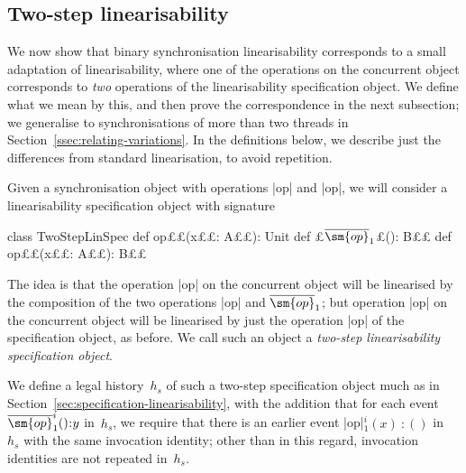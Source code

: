 
\subsection{Two-step linearisability}


We now show that binary synchronisation linearisability corresponds to a small
adaptation of linearisability, where one of the operations on the concurrent
object corresponds to \emph{two} operations of the linearisability
specification object.  We define what we mean by this, and then prove the
correspondence in the next subsection; we generalise to synchronisations of
more than two threads in Section~\ref{ssec:relating-variations}.  In the
definitions below, we describe just the differences from standard
linearisation, to avoid repetition.

Given a synchronisation object with operations |op| and |op|,
we will consider a linearisability specification object with signature
%
\begin{scala}
class TwoStepLinSpec{
  def op££(x££: A££): Unit
  def £$\overline{\sm{op}}_1$£(): B££
  def op££(x££: A££): B££
}
\end{scala}
%
The idea is that the operation |op| on the concurrent object will be
linearised by the composition of the two operations |op| and
$\overline{\sm{op}}_1$; but operation |op| on the concurrent object will be
linearised by just the operation |op| of the specification object, as
before.  We call such an object a \emph{two-step linearisability specification
  object}. 

We define a legal history~$h_s$ of such a two-step specification object much
as in Section~\ref{sec:specification-linearisability}, with the addition that
for each event $\overline{\sm{op}}_1^i()\::y$ in~$h_s$, we require that there
is an earlier event |op|$_1^i(x)\::()$ in~$h_s$ with the same invocation
identity; other than in this regard, invocation identities are not repeated
in~$h_s$.

